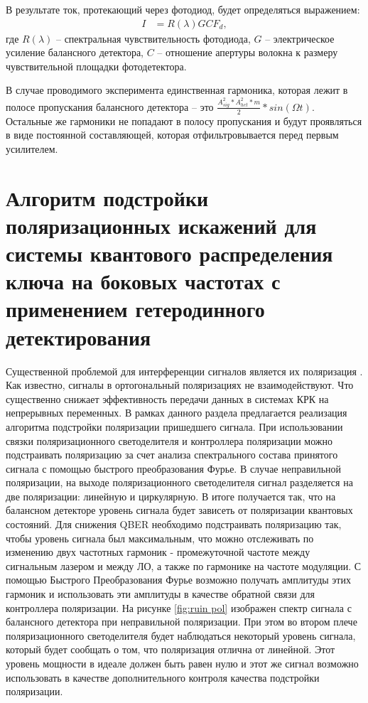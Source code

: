 В результате ток, протекающий через фотодиод, будет определяться выражением:
\begin{align}
   I &= R(\lambda)G C F_d,
\end{align} 
где $R(\lambda)$ -- спектральная чувствительность фотодиода, $G$ -- электрическое усиление балансного детектора, $C$ -- отношение апертуры волокна к размеру чувствительной площадки фотодетектора. 

В случае проводимого эксперимента единственная гармоника, которая лежит в полосе пропускания балансного детектора -- это $\frac{A_{sig}^2 *A_{het}^2 *m}{2} * sin(\Omega t)$.
Остальные же гармоники не попадают в полосу пропускания и будут проявляться в виде постоянной составляющей, которая отфильтровывается перед первым усилителем. 

\section{Алгоритм подстройки поляризационных искажений для системы квантового распределения ключа на боковых частотах с применением гетеродинного детектирования}\label{sec:ch3/sect5}
Существенной проблемой для интерференции сигналов является их поляризация \cite{liu2020a}. Как известно, сигналы в ортогональный поляризациях не взаимодействуют. Что существенно снижает эффективность передачи данных в системах КРК на непрерывных переменных. В рамках данного раздела предлагается реализация алгоритма подстройки поляризации пришедшего сигнала.
При использовании связки поляризационного светоделителя и контроллера поляризации можно подстраивать поляризацию за счет анализа спектрального состава принятого сигнала с помощью быстрого преобразования Фурье. В случае неправильной поляризации, на выходе поляризационного светоделителя сигнал разделяется на две поляризации: линейную и циркулярную. В итоге получается так, что на балансном детекторе уровень сигнала будет зависеть от поляризации квантовых состояний. Для снижения QBER необходимо подстраивать поляризацию так, чтобы уровень сигнала был максимальным, что можно отслеживать по изменению двух частотных гармоник  - промежуточной частоте между сигнальным лазером и между ЛО, а также по гармонике на частоте модуляции. С помощью Быстрого Преобразования Фурье возможно получать амплитуды этих гармоник и использовать эти амплитуды в качестве обратной связи для контроллера поляризации. На рисунке \ref{fig:ruin pol} изображен спектр сигнала с балансного детектора при неправильной поляризации. При этом во втором плече поляризационного светоделителя будет наблюдаться некоторый уровень сигнала, который будет сообщать о том, что поляризация отлична от линейной. Этот уровень мощности в идеале должен быть равен нулю и этот же сигнал возможно использовать в качестве дополнительного контроля качества подстройки поляризации.

